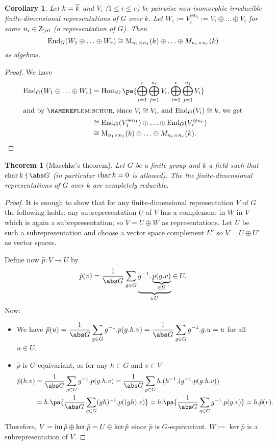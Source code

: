 \documentclass[12pt,a4paper]{scrartcl}
\theoremstyle{cplain}
\newtheorem{cor}[thmcounter]{Corollary}
\theoremstyle{cplain}
\newtheorem{thm}[thmcounter]{Theorem}
\theoremstyle{cplain}
\theoremstyle{definition}
\begin{document}
\begin{otherlanguage}{english}
\begin{cor}
  Let $k=\overline k$ and $V_i$ ($1 \le i \le r$) be pairwise non-isomorphic irreducible finite-dimensional representations of $G$ over $k$. Let $W_i := V_i^{\oplus n_i} := V_i \oplus \ldots \oplus V_i$ for some $n_i \in \operatorname{Z}_{>0}$ (a representation of $G$). Then \[ \operatorname{End}_G(W_1 \oplus \ldots \oplus W_r) \cong \operatorname{M}_{n_1\times n_1}(k) \oplus \ldots \oplus M_{n_r \times n_r}(k) \] as algebras.
\end{cor}
\begin{proof}
  We have
  \begin{align*}
    \End_G(W_1\oplus \ldots\oplus W_r) &= \Hom_G\pa{\bigoplus_{i=1}^r\bigoplus_{j=1}^{n_i} V_i,\bigoplus_{i=1}^r\bigoplus_{j=1}^{n_i} V_i } \\
    \intertext{and by \namereff{lem:schur}, since $V_i \cong V_i$, and $\End_G(V_i)\cong k$, we get}
    &\cong \End_G(V_1^{\oplus n_1}) \oplus \ldots \oplus \End_G(V_r^{\oplus n_r})\\ & \cong \M_{n_1\times n_1}(k) \oplus \ldots \oplus M_{n_r \times n_r}(k).
    \qedhere
  \end{align*}
\end{proof}


\begin{thm}[Maschke's theorem] \label{thm:maschke}
  Let $G$ be a finite group and $k$ a field such that $\chr k \nmid \abs G$ (in particular $\operatorname{char} k = 0$ is allowed). The the finite-dimensional representations of $G$ over $k$ are completely reducible.
\end{thm}
\begin{proof}
  It is enough to show that for any finite-dimensional representation $V$ of $G$ the following holds: any subrepresentation $U$ of $V$ has a complement in $W$ in $V$ which is again a subrepresentation; so $V = U \oplus W$ as representations. Let $U$ be such a subrepresentation and choose a vector space complement $U'$ so $V = U \oplus U'$ as vector spaces.
  
  Define now $\hat p\colon V \to U $ by \[ \hat p(v) = \frac1{\abs G} \sum_{g \in G}\underbrace{g^{-1}.\underbrace{p(g.v)}_{\in U}}_{\in U} \in U. \]
  Now:
  \begin{itemize}
    \item We have ${\displaystyle\hat p(u) = \frac1{\abs G} \sum_{g\in G} g^{-1} .p(g.h.v) = \frac1{\abs G}\sum_{g \in G}g^{-1}.g.u = u }$ for all $u\in U$.
    \item $\hat p$ is $G$-equivariant, as for any $h\in G$ and $v\in V$
    \begin{align*}
      \hat p(h.v) &= \frac1{\abs G} \sum_{g \in G}g^{-1}.p(g.h.v) = \frac1{\abs G} \sum_{g\in G} h.(h^{-1}.(g^{-1}.p(g.h.v)) \\
      &= h.\pa{\frac1{\abs G} \sum_{g \in G} (gh)^{-1}.p((gh).v)} = h.\pa{\frac1{\abs G} \sum_{g \in G} g^{-1}.p(g.v)} = h.\hat p(v).
    \end{align*}
  \end{itemize}
  Therefore, $V = \operatorname{im} \hat p \oplus \operatorname{ker} \hat p = U \oplus \operatorname{ker} \hat p$ since $\hat p$ is $G$-equivariant. $W := \ker \hat p$ is a subrepresentation of $V$.
\end{proof}

\end{otherlanguage}
\end{document}
